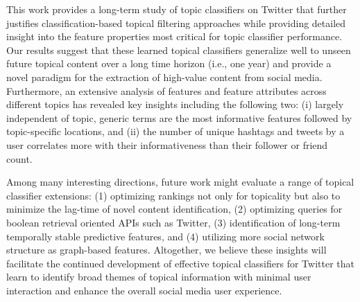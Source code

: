 \COMMENT
This work provides a long-term study of topic classifiers on Twitter that further justifies classification-based topical filtering approaches while providing detailed insight into the feature properties most critical for topic classifier performance.
%
Our results suggest that these learned topical classifiers generalize well
to unseen future topical content over a long time horizon (i.e., one year)
and provide a novel paradigm for the
extraction of high-value content from social media. Furthermore, an
extensive analysis of features and feature attributes across different
topics has revealed key insights including the following two: 
(i) largely independent of
topic, generic terms are the most informative features followed by
topic-specific locations, and (ii) the number of unique hashtags and
tweets by a user correlates more with their informativeness than their
follower or friend count.

Among many interesting directions, future work might evaluate a range of 
topical classifier extensions: (1)
optimizing rankings not only for topicality but also to minimize the
lag-time of novel content identification, (2) optimizing queries for
boolean retrieval oriented APIs such as Twitter, (3) identification of 
long-term temporally stable predictive features, and (4) utilizing
more social network structure as graph-based 
features.  Altogether, we believe these insights will facilitate 
the continued development of effective topical classifiers for Twitter that learn to
identify broad themes of topical information with minimal user
interaction and enhance the overall social media user experience.
\ENDCOMMENT